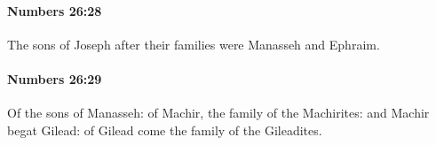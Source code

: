 		\paragraph{Numbers 26:28} %
			\label{NUMBERS-26-28}

			The sons of Joseph after their families were Manasseh and Ephraim.


		\paragraph{Numbers 26:29} %
			\label{NUMBERS-26-29}

			Of the sons of Manasseh: of Machir, the family of the Machirites: and Machir begat Gilead: of Gilead come the family of the Gileadites.


